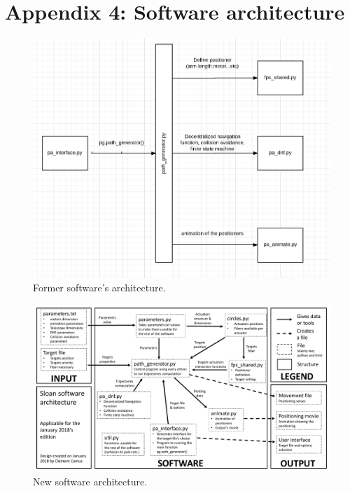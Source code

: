 \section{Appendix 4: Software architecture}

\begin{figure}[h]
\begin{center}
	\includegraphics[width=\textwidth]{appendix/former_architecture.png}
	\caption{Former software's architecture.}
	\label{fig:appendix:former_architecture}
\end{center}
\end{figure}

\begin{figure}
\begin{center}
	\includegraphics[width=\textwidth]{appendix/new_architecture.pdf}
	\caption{New software architecture.}
	\label{fig:appendix:new_architecture}
\end{center}
\end{figure}

